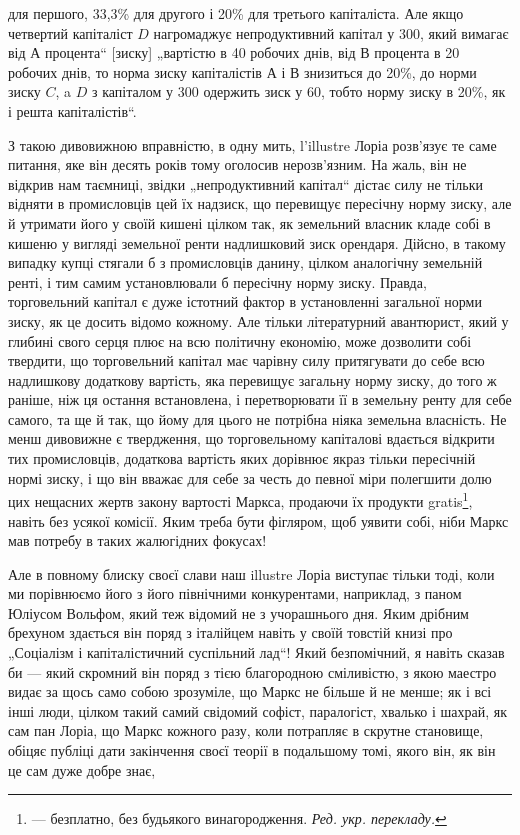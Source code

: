 \parcont{}  %
для першого, 33,3\%  для другого і 20\% для третього капіталіста.
Але якщо четвертий капіталіст $D$ нагромаджує непродуктивний
капітал у 300, який вимагає від $А$ процента“ [зиску]
„вартістю в 40 робочих днів, від $В$ процента в 20 робочих днів,
то норма зиску капіталістів $А$ і $В$ знизиться до 20\%, до норми
зиску $C$, a $D$ з капіталом у 300 одержить зиск у 60, тобто
норму зиску в 20\%, як і решта капіталістів“.

З такою дивовижною вправністю, в одну мить, l’illustre Лоріа
розв’язує те саме питання, яке він десять років тому оголосив
нерозв’язним. На жаль, він не відкрив нам таємниці, звідки
„непродуктивний капітал“ дістає силу не тільки відняти в промисловців
цей їх надзиск, що перевищує пересічну норму
зиску, але й утримати його у своїй кишені цілком так, як земельний
власник кладе собі в кишеню у вигляді земельної ренти надлишковий
зиск орендаря. Дійсно, в такому випадку купці стягали
б з промисловців данину, цілком аналогічну земельній ренті,
і тим самим установлювали б пересічну норму зиску. Правда,
торговельний капітал є дуже істотний фактор в установленні
загальної норми зиску, як це досить відомо кожному. Але тільки
літературний авантюрист, який у глибині свого серця плює на
всю політичну економію, може дозволити собі твердити, що
торговельний капітал має чарівну силу притягувати до себе
всю надлишкову додаткову вартість, яка перевищує загальну
норму зиску, до того ж раніше, ніж ця остання встановлена,
і перетворювати її в земельну ренту для себе самого, та ще
й так, що йому для цього не потрібна ніяка земельна власність.
Не менш дивовижне є твердження, що торговельному капіталові
вдається відкрити тих промисловців, додаткова вартість яких
дорівнює якраз тільки пересічній нормі зиску, і що він вважає для
себе за честь до певної міри полегшити долю цих нещасних жертв
закону вартості Маркса, продаючи їх продукти gratis\footnote*{
— безплатно, без будьякого винагородження. \emph{Ред. укр. перекладу.}
}, навіть
без усякої комісії. Яким треба бути фігляром, щоб уявити собі,
ніби Маркс мав потребу в таких жалюгідних фокусах!

Але в повному блиску своєї слави наш illustre Лоріа виступає
тільки тоді, коли ми порівнюємо його з його північними
конкурентами, наприклад, з паном Юліусом Вольфом, який теж
відомий не з учорашнього дня. Яким дрібним брехуном здається він
поряд з італійцем навіть у своїй товстій книзі про „Соціалізм
і капіталістичний суспільний лад“! Який безпомічний, я навіть
сказав би — який скромний він поряд з тією благородною сміливістю,
з якою маестро видає за щось само собою зрозуміле,
що Маркс не більше й не менше; як і всі інші люди, цілком
такий самий свідомий софіст, паралогіст, хвалько і шахрай, як
сам пан Лоріа, що Маркс кожного разу, коли потрапляє в
скрутне становище, обіцяє публіці дати закінчення своєї теорії
в подальшому томі, якого він, як він це сам дуже добре знає,
\parbreak{}  %
